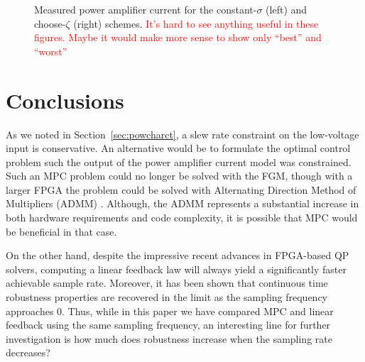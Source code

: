 \documentclass[twocolumn,twoside]{IEEEtran}
\begin{document}
\begin{figure*}
  \begin{subfigure}[t]{1\columnwidth}
    
\end{subfigure}
\begin{subfigure}[t]{1\columnwidth}
  
\end{subfigure}
\caption{Measured power amplifier current for the constant-$\sigma$ (left) and choose-$\zeta$ (right) schemes.
\textcolor{red}{It's hard to see anything useful in these figures. Maybe it would make more sense to show only ``best'' and ``worst''}}
\label{fig:Ipow_exp}
\end{figure*}


\section{Conclusions}


As we noted in Section~\ref{sec:powcharct}, a slew rate constraint on the low-voltage input is conservative. An alternative would be to formulate the optimal control problem such the output of the power amplifier current model was constrained. Such an MPC problem could no longer be solved with the FGM, though with a larger FPGA the problem could be solved with Alternating Direction Method of Multipliers (ADMM) \cite{Jerez_Trans_2014}. Although, the ADMM represents a substantial increase in both hardware requirements and code complexity, it is possible that MPC would be beneficial in that case. 

On the other hand, despite the impressive recent advances in FPGA-based QP solvers, computing a linear feedback law will always yield a significantly faster achievable sample rate. Moreover, it has been shown that continuous time robustness properties are recovered in the limit as the sampling frequency approaches 0. Thus, while in this paper we have compared MPC and linear feedback using the same sampling frequency, an interesting line for further investigation is how much does robustness increase when the sampling rate decreases?





\end{document}
